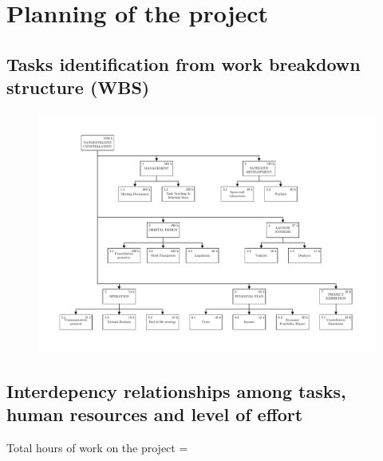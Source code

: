 \section{Planning of the project}

\subsection{Tasks identification from work breakdown structure (WBS)}
%
\begin{figure}[h]
\includegraphics[width=1.1\textwidth]{./external_pdf/G4-PC-WBS-10-04.pdf}
\end{figure}

\pagebreak


\subsection{Interdepency relationships among tasks, human resources and level of effort}


Total hours of work on the project = 

